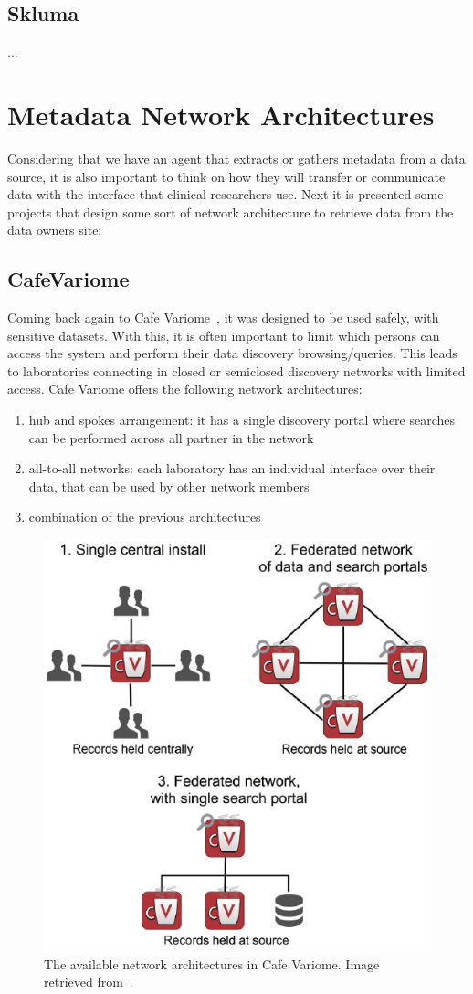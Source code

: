 \subsection*{Skluma}
...


\section{Metadata Network Architectures}

Considering that we have an agent that extracts or gathers metadata from a data source,
it is also important to think on how they will transfer or communicate data with the
interface that clinical researchers use.
Next it is presented some projects that design some sort of network architecture to
retrieve data from the data owners site:


\subsection*{CafeVariome}
Coming back again to Cafe Variome~\cite{cafevariome}, it was designed to be used safely, with sensitive datasets.
With this, it is often important to limit which persons can access the system and perform their data discovery browsing/queries.
This leads to laboratories connecting in closed or semiclosed discovery networks with limited access.
Cafe Variome offers the following network architectures:
\begin{enumerate}
    \item hub and spokes arrangement: it has a single discovery portal where searches can be performed across all partner in the network
    \item all-to-all networks: each laboratory has an individual interface over their data, that can be used by other network members
    \item combination of the previous architectures
\end{enumerate}

\begin{figure}[H]
    \centering
    \includegraphics[width=.5\linewidth]{cafevariome-network.png}
    \caption{The available network architectures in Cafe Variome. Image retrieved from~\cite{cafevariome}.}
\end{figure}

